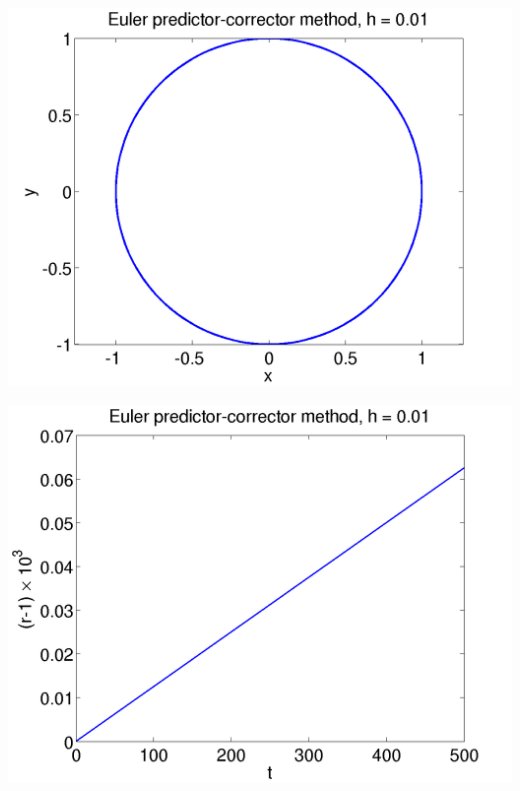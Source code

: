 \documentclass{beamer}
\begin{document}
\begin{frame}
\begin{columns}
\begin{column}{0.5\textwidth}
\begin{overlayarea}{\textwidth}{0.6\textheight}
{\begin{center}
          \end{center}
        }
        {
          \begin{center}
            \includegraphics[height=0.5\textheight]{figures/EulerPC2}
          \end{center}
        }
        {
          \begin{center}
            \includegraphics[height=0.5\textheight]{figures/EulerPC_rad2}
          \end{center}
        }
      \end{overlayarea}
    \end{column}
  \end{columns}

\end{frame}
\end{document}
